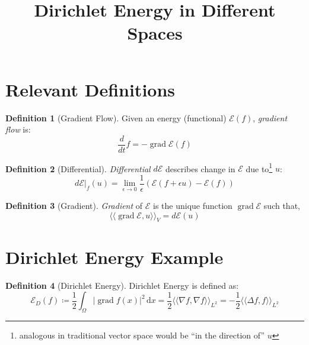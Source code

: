 \documentclass[a4paper]{article}
\title{Dirichlet Energy in Different Spaces}
\author{ }
\newcommand{\llangle}{\langle \langle}
\newcommand{\rrangle}{\rangle \rangle}
\newcommand{\dx}{\, \text{d} x}
\theoremstyle{definition}
\newtheorem{definition}{Definition}
\DeclareMathOperator{\grad}{grad}
\begin{document}
\maketitle
\section{Relevant Definitions}
\begin{definition}[Gradient Flow]
    Given an energy (functional) $\mathcal{E}(f)$, \emph{gradient flow} is:
    \begin{equation}
        \frac{d}{dt}f = - \grad \mathcal{E}(f)
        \label{equ: Gradient Flow}
    \end{equation}
\end{definition}

\begin{definition}[Differential]
    \emph{Differential} $d\mathcal{E}$ describes change in $\mathcal{E}$ due to\footnote{analogous in traditional vector space would be ``in the direction of'' $u$} $u$:
    \begin{equation}
        d \mathcal{E}|_f(u) = \lim_{\epsilon \rightarrow 0} \frac{1}{\epsilon} \left( \mathcal{E}(f+\epsilon u) - \mathcal{E}(f) \right)
        \label{equ: Differential}
    \end{equation}
\end{definition}

\begin{definition}[Gradient]
    \emph{Gradient} of $\mathcal{E}$ is the unique function $\grad \mathcal{E}$ such that,
    \begin{equation}
        \llangle \grad \mathcal{E}, u \rrangle_V = d \mathcal{E}(u)
        \label{equ: Gradient}
    \end{equation}
\end{definition}

\section{Dirichlet Energy Example}

\begin{definition}[Dirichlet Energy]
    Dirichlet Energy is defined as:
    \begin{equation}
        \mathcal{E}_D(f) \coloneqq \frac{1}{2} \int_{\Omega} |\grad f(x)|^2 \dx
        = \frac{1}{2} \llangle \nabla f, \nabla f \rrangle_{L^2}
        = -\frac{1}{2} \llangle \Delta f, f \rrangle_{L^2}
        \label{equ: Dirichlet Energy}
    \end{equation}
\end{definition}
\end{document}

